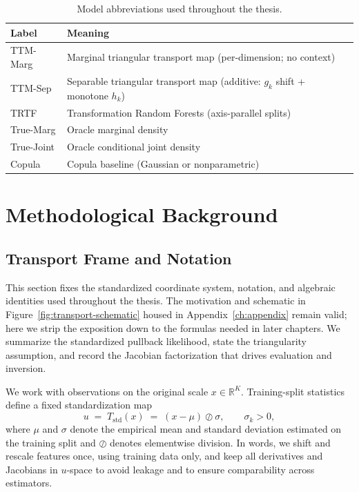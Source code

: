 \documentclass[11pt,a4paper,twoside]{book}\usepackage[]{graphicx}\usepackage[]{xcolor}
\begin{document}
\begin{table}[t]
  \centering
  \caption{Model abbreviations used throughout the thesis.}
  \label{tab:model-abbrev}
  \begin{tabular}{ll}
    \hline
    Label & Meaning \\
    \hline
    TTM-Marg & Marginal triangular transport map (per-dimension; no context) \\
    TTM-Sep & Separable triangular transport map (additive: $g_k$ shift + monotone $h_k$) \\
    TRTF & Transformation Random Forests (axis-parallel splits) \\
    True-Marg & Oracle marginal density \\
    True-Joint & Oracle conditional joint density \\
    Copula & Copula baseline (Gaussian or nonparametric) \\
    \hline
  \end{tabular}
\end{table}





\chapter{Methodological Background}\label{ch:background}

\section{Transport Frame and Notation}\label{sec:transport-frame}

This section fixes the standardized coordinate system, notation, and algebraic identities used throughout the thesis. The motivation and schematic in Figure~\ref{fig:transport-schematic} housed in Appendix~\ref{ch:appendix} remain valid; here we strip the exposition down to the formulas needed in later chapters. We summarize the standardized pullback likelihood, state the triangularity assumption, and record the Jacobian factorization that drives evaluation and inversion.

We work with observations on the original scale $x \in \mathbb{R}^K$. Training-split statistics define a fixed standardization map
\begin{equation}
  u \;=\; T_{\mathrm{std}}(x) \;=\; (x-\mu)\oslash\sigma,\qquad \sigma_k>0,\label{eq:transport-standardise}
\end{equation}
where $\mu$ and $\sigma$ denote the empirical mean and standard deviation estimated on the training split and $\oslash$ denotes elementwise division. In words, we shift and rescale features once, using training data only, and keep all derivatives and Jacobians in $u$-space to avoid leakage and to ensure comparability across estimators.
\end{document}
